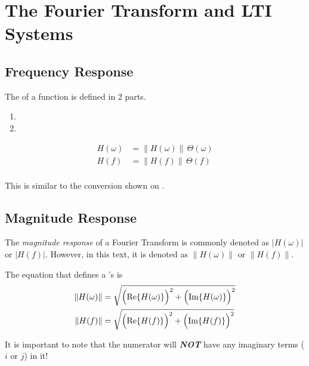 \section{The Fourier Transform and LTI Systems}\label{sec:Fourier_Transform-LTI_Systems}
\subsection{Frequency Response}\label{subsec:Fourier_Frequency_Response}
The  of a function is defined in 2 parts.
\begin{enumerate}[noitemsep]
\item {}
\item {}
\end{enumerate}
\begin{equation}\label{eq:Fourier_Frequency_Response}
  \begin{aligned}
    H(\omega) &= \lVert H(\omega) \rVert \, \Theta(\omega) \\
    H(f) &= \lVert H(f) \rVert \, \Theta(f) \\
  \end{aligned}
\end{equation}

\begin{remark*}
  This is similar to the  conversion shown on .
\end{remark*}

\subsection{Magnitude Response}\label{subsec:Fourier_Magnitude_Response}
\begin{definition}\label{def:Fourier_Magnitude_Response}
  The \emph{magnitude response} of a Fourier Transform is commonly denoted as $\lvert H(\omega) \rvert$ or $\lvert H(f) \rvert$.
  However, in this text, it is denoted as $\lVert H(\omega) \rVert$ or $\lVert H(f) \rVert$.

  The equation that defines a 's  is
  \begin{equation}\label{eq:Fourier_Magnitude_Response}
    \begin{aligned}
      \lVert H(\omega) \rVert &= \sqrt{{\Bigl( \Re \lbrace H(\omega) \rbrace \Bigr)}^{2} + {\Bigl( \Im \lbrace H(\omega) \rbrace \Bigr)}^{2}} \\
      \lVert H(f) \rVert &= \sqrt{{\Bigl( \Re \lbrace H(f) \rbrace \Bigr)}^{2} + {\Bigl( \Im \lbrace H(f) \rbrace \Bigr)}^{2}} \\
    \end{aligned}
  \end{equation}

  \begin{remark}
    It is important to note that the numerator will \textbf{\emph{NOT}} have any imaginary terms ($i$ or $j$) in it!
  \end{remark}
\end{definition}

